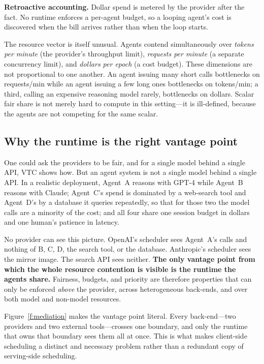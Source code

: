 \documentclass[letterpaper,11pt,leqno]{article}
\begin{document}
\textbf{Retroactive accounting.} Dollar spend is metered by the provider after the fact. No runtime enforces a per-agent budget, so a looping agent's cost is discovered when the bill arrives rather than when the loop starts.

The resource vector is itself unusual. Agents contend simultaneously over \emph{tokens per minute} (the provider's throughput limit), \emph{requests per minute} (a separate concurrency limit), and \emph{dollars per epoch} (a cost budget). These dimensions are not proportional to one another. An agent issuing many short calls bottlenecks on requests/min while an agent issuing a few long ones bottlenecks on tokens/min; a third, calling an expensive reasoning model rarely, bottlenecks on dollars. Scalar fair share is not merely hard to compute in this setting---it is ill-defined, because the agents are not competing for the same scalar.

\subsection{Why the runtime is the right vantage point}\label{s:vantage}

One could ask the providers to be fair, and for a single model behind a single API, VTC \citep{Sheng24} shows how. But an agent system is not a single model behind a single API. In a realistic deployment, Agent~A reasons with GPT-4 while Agent~B reasons with Claude; Agent~C's spend is dominated by a web-search tool and Agent~D's by a database it queries repeatedly, so that for those two the model calls are a minority of the cost; and all four share one session budget in dollars and one human's patience in latency.

No provider can see this picture. OpenAI's scheduler sees Agent~A's calls and nothing of B, C, D, the search tool, or the database. Anthropic's scheduler sees the mirror image. The search API sees neither. \textbf{The only vantage point from which the whole resource contention is visible is the runtime the agents share.} Fairness, budgets, and priority are therefore properties that can only be enforced \emph{above} the provider, across heterogeneous back-ends, and over both model and non-model resources.

Figure~\ref{f:mediation} makes the vantage point literal. Every back-end---two providers and two external tools---crosses one boundary, and only the runtime that owns that boundary sees them all at once. This is what makes client-side scheduling a distinct and necessary problem rather than a redundant copy of serving-side scheduling.
\end{document}
